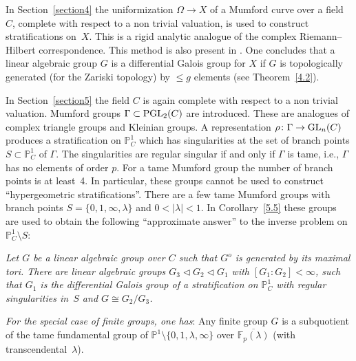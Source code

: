 \documentclass[10pt,a4paper]{amsart}
\numberwithin{equation}{section}
\begin{document}
In Section~\ref{section4} the uniformization $\Omega \rightarrow X$ of a Mumford curve over a field $C$, complete with respect to a non trivial valuation, is used to construct stratifications on~$X$. This is a rigid analytic analogue of the complex Riemann--Hilbert correspondence. This method is also present in \cite{Sa}. One concludes that
a linear algebraic group $G$ is a differential Galois group for $X$ if $G$ is topologically generated (for the Zariski topology) by $\leq g$ elements (see Theorem~\ref{4.2}).

In Section~\ref{section5} the field $C$ is again complete with respect to a non trivial valuation. Mumford groups $\Gamma\subset {\rm PGL}_2(C)$ are introduced. These are analogues of complex triangle groups and Kleinian groups. A representation $\rho\colon \Gamma \rightarrow {\rm GL}_n(C)$ produces a stratification on $\mathbb{P}^1_C$ which has
singularities at the set of branch points $S\subset \mathbb{P}^1_C$ of $\Gamma$. The singularities are regular singular if and only if $\Gamma$ is tame, i.e., $\Gamma$ has no elements of order $p$. For a tame Mumford group the number of branch points is at least~4. In particular, these groups cannot be used to construct ``hypergeometric stratifications''. There are a few tame Mumford groups with branch points $S=\{0,1,\infty ,\lambda \}$ and $0<|\lambda |<1$. In Corollary~\ref{5.5} these groups are used to obtain the following ``approximate answer'' to the inverse problem on $\mathbb{P}_C^1\setminus S$:

{\it Let $G$ be a linear algebraic group over $C$ such that $G^o$ is generated by its maximal tori. There are linear algebraic groups $G_3\lhd G_2\lhd G_1$ with $[G_ 1:G_2]< \infty$, such that $G_1$ is the differential Galois group of a stratification on $\mathbb{P}^1_C$ with regular singularities in~$S$ and $G\cong G_2/G_3$.

{\em For the special case of finite groups, one has}: Any finite group $G$ is a subquotient of the tame fundamental group of $\mathbb{P}^1\setminus \{0,1,\lambda ,\infty \}$ over $\overline{\mathbb{F}_p(\lambda )}$ (with transcendental~$\lambda$).}
\end{document}
